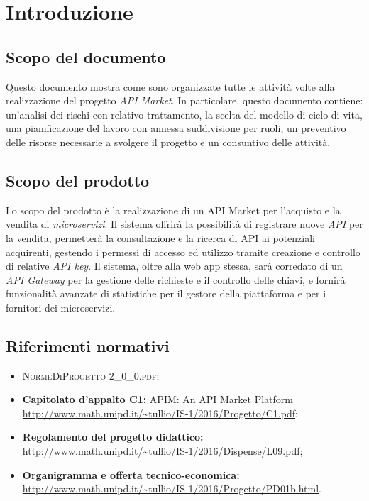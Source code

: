 \newpage
\section{Introduzione}

\subsection{Scopo del documento}
Questo documento mostra come sono organizzate tutte le attività volte alla realizzazione del progetto \textit{API Market}. In particolare, questo documento contiene: un'analisi dei rischi con relativo trattamento, la scelta del modello di ciclo di vita, una pianificazione del lavoro con annessa suddivisione per ruoli, un preventivo delle risorse necessarie a svolgere il progetto e un consuntivo delle attività.

\subsection{Scopo del prodotto}
Lo scopo del prodotto è la realizzazione di un API Market per l'acquisto e la vendita di \textit{microservizi}. Il sistema offrirà la possibilità di registrare nuove \textit{API} per la vendita, permetterà la consultazione e la ricerca di API ai potenziali acquirenti, gestendo i permessi di accesso ed utilizzo tramite creazione e controllo di relative \textit{API key}. Il sistema, oltre alla web app stessa, sarà corredato di un \textit{API Gateway} per la gestione delle richieste e il controllo delle chiavi, e fornirà funzionalità avanzate di statistiche per il gestore della piattaforma e per i fornitori dei microservizi.

\subsection{Riferimenti normativi}
	\begin{itemize}
		\item \textsc{NormeDiProgetto 2\_0\_0.pdf};
		\item \textbf{Capitolato d’appalto C1:} APIM: An API Market Platform\\ \url{http://www.math.unipd.it/~tullio/IS-1/2016/Progetto/C1.pdf};
		\item \textbf{Regolamento del progetto didattico:}\\
		\url{http://www.math.unipd.it/~tullio/IS-1/2016/Dispense/L09.pdf};
		\item \textbf{Organigramma e offerta tecnico-economica:}\\
		\url{http://www.math.unipd.it/~tullio/IS-1/2016/Progetto/PD01b.html}.
	\end{itemize}

